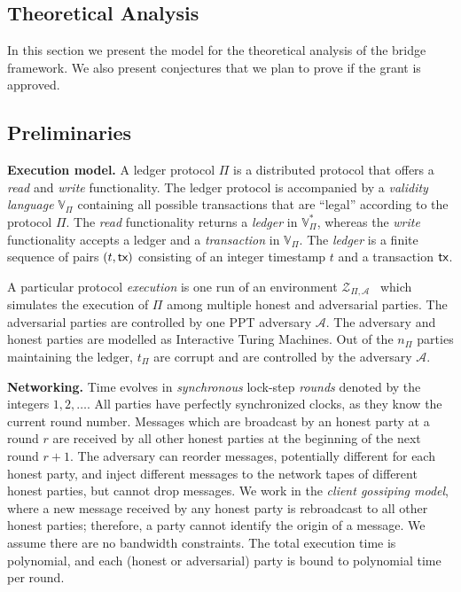 \subsection{Theoretical Analysis}\label{sec:theory}
In this section we present the model for the theoretical analysis of the bridge framework. 
We also present conjectures that we plan to prove if the grant is approved.
\subsection{Preliminaries}
\noindent
\textbf{Execution model.}
A ledger protocol $\Pi$ is a distributed protocol that offers
a \emph{read} and \emph{write} functionality.
The ledger protocol is accompanied by a \emph{validity language}
$\mathbb{V}_{\Pi}$ containing all possible transactions that are ``legal''
according to the protocol $\Pi$.
The
\emph{read} functionality returns a \emph{ledger} in $\mathbb{V}_{\Pi}^*$,
whereas the \emph{write} functionality accepts a ledger and a \emph{transaction} in $\mathbb{V}_\Pi$.
The \emph{ledger} is a finite sequence of pairs $(t, \textsf{tx})$ consisting
of an integer timestamp $t$ and a transaction $\textsf{tx}$.

A particular protocol \emph{execution}
is one run of an environment $\mathcal{Z}_{\Pi,\mathcal{A}}$~\cite{FOCS:Canetti01} which simulates
the execution of $\Pi$ among multiple honest and adversarial parties. The adversarial
parties are controlled by one PPT adversary $\mathcal{A}$. The adversary and honest
parties are modelled as Interactive Turing Machines.
Out of the
$n_\Pi$ parties maintaining the ledger, $t_\Pi$ are corrupt and are controlled by the adversary
$\mathcal{A}$.

\noindent
\textbf{Networking.}
Time evolves in \emph{synchronous} lock-step \emph{rounds} denoted by the integers $1, 2,
\ldots$. All parties have perfectly synchronized clocks, as they know the current round number.
Messages which are broadcast by an honest party at a round $r$ are received by all
other honest parties at the beginning of the next round $r + 1$. The adversary
can reorder messages, potentially different for each honest party, and
inject different messages to the network tapes of different honest parties,
but cannot drop messages. We work in the \emph{client gossiping model}, where
a new message received by any honest party is rebroadcast to all other honest
parties; therefore, a party cannot identify the origin of a message. We assume there are no bandwidth constraints.
The total execution time is polynomial, and each (honest or adversarial)
party is bound to polynomial time per round.

